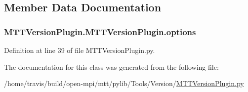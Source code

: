 \subsection{Member Data Documentation}
\hypertarget{class_m_t_t_version_plugin_1_1_m_t_t_version_plugin_a95c4231c332e3aa0af05703aa9858c8c}{
\subsubsection[{options}]{\setlength{\rightskip}{0pt plus 5cm}M\-T\-T\-Version\-Plugin.\-M\-T\-T\-Version\-Plugin.\-options}}\label{class_m_t_t_version_plugin_1_1_m_t_t_version_plugin_a95c4231c332e3aa0af05703aa9858c8c}


Definition at line 39 of file M\-T\-T\-Version\-Plugin.\-py.



The documentation for this class was generated from the following file\-:\begin{DoxyCompactItemize}
\item 
/home/travis/build/open-\/mpi/mtt/pylib/\-Tools/\-Version/\hyperlink{_m_t_t_version_plugin_8py}{M\-T\-T\-Version\-Plugin.\-py}\end{DoxyCompactItemize}
